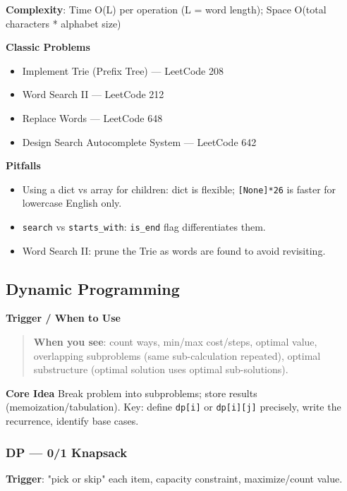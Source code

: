 \documentclass[11pt]{article}
\providecommand{\tightlist}{\setlength{\itemsep}{1pt}\setlength{\parskip}{0pt}}
\begin{document}
\textbf{Complexity}: Time O(L) per operation (L = word length); Space O(total characters * alphabet size)

\textbf{Classic Problems}

\begin{itemize}
\tightlist
\item
  Implement Trie (Prefix Tree) --- LeetCode 208
\item
  Word Search II --- LeetCode 212
\item
  Replace Words --- LeetCode 648
\item
  Design Search Autocomplete System --- LeetCode 642
\end{itemize}

\textbf{Pitfalls}

\begin{itemize}
\tightlist
\item
  Using a dict vs array for children: dict is flexible; \texttt{{[}None{]}*26} is faster for lowercase English only.
\item
  \texttt{search} vs \texttt{starts\_with}: \texttt{is\_end} flag differentiates them.
\item
  Word Search II: prune the Trie as words are found to avoid revisiting.
\end{itemize}

\subsection{Dynamic Programming}\label{dynamic-programming}

\textbf{Trigger / When to Use}

\begin{quote}
\textbf{When you see}: count ways, min/max cost/steps, optimal value, overlapping subproblems (same sub-calculation repeated), optimal substructure (optimal solution uses optimal sub-solutions).
\end{quote}

\textbf{Core Idea}
Break problem into subproblems; store results (memoization/tabulation). Key: define \texttt{dp{[}i{]}} or \texttt{dp{[}i{]}{[}j{]}} precisely, write the recurrence, identify base cases.

\subsubsection{DP --- 0/1 Knapsack}\label{dp--01-knapsack}

\textbf{Trigger}: "pick or skip" each item, capacity constraint, maximize/count value.
\end{document}
